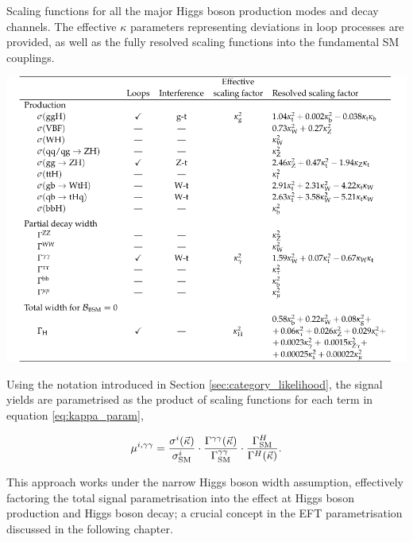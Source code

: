 \begin{table}[t]
  \centering
  \caption[The $\kappa$-framework parametrisation]
  {
    Scaling functions for all the major Higgs boson production modes and decay channels. The effective $\kappa$ parameters representing deviations in loop processes are provided, as well as the fully resolved scaling functions into the fundamental SM couplings.
  }
  \label{tab:kappa_param}
  \includegraphics[width=1\textwidth]{Tables/hgg_results/kappa_table.pdf}
\end{table}

Using the notation introduced in Section \ref{sec:category_likelihood}, the signal yields are parametrised as the product of scaling functions for each term in equation \ref{eq:kappa_param},

\begin{equation}
    \mu^{i,\gamma\gamma} = \frac{\sigma^i(\vec{\kappa})}{\sigma^i_{\rm{SM}}} \cdot \frac{\Gamma^{\gamma\gamma}(\vec{\kappa})}{\Gamma^{\gamma\gamma}_{\rm{SM}}} \cdot \frac{\Gamma^H_{\rm{SM}}}{\Gamma^{H}(\vec{\kappa})}.
\end{equation}

\noindent
This approach works under the narrow Higgs boson width assumption, effectively factoring the total signal parametrisation into the effect at Higgs boson production and Higgs boson decay; a crucial concept in the EFT parametrisation discussed in the following chapter.

